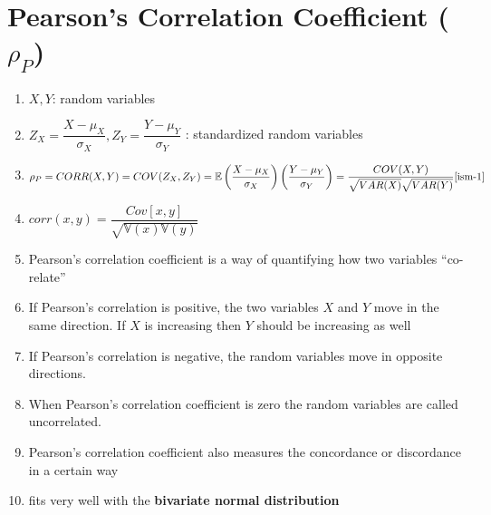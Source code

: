 \section{Pearson’s Correlation Coefficient ($\rho_P$) \cite{ism-1,mfml-1}} \label{Multivariate Distributions: Pearson’s Correlation Coefficient}

\begin{enumerate}
    \item[] $X,Y$: random variables
    
    \vspace{0.1cm}
    \item[] $
        Z_X = \dfrac{X - \mu_X}{\sigma_X},
        Z_Y = \dfrac{Y - \mu_Y}{\sigma_Y}
    $ : standardized random variables

    \vspace{0.2cm}
    
    \item[] 
    \[
        \rho_P 
        = CORR(X,Y)
        = COV(Z_X, Z_Y)
        = \mathbb{E}\dParenBrac{ \dfrac{X - \mu_X}{\sigma_X}} \dParenBrac{ \dfrac{Y - \mu_Y}{\sigma_Y} }
        = \dfrac{COV(X,Y)}{\sqrt{VAR(X)} \sqrt{VAR(Y)}}
        \hfill \text{\cite{ism-1}}
    \]
    
    \item[] $
        corr(x,y)
        = \dfrac{Cov[x,y]}{\sqrt{\mathbb{V}(x) \mathbb{V}(y)}}
    $ \hfill \cite{mfml-1}
    
    \vspace{0.2cm}
    
    \item Pearson’s correlation coefficient is a way of quantifying how two variables “co-relate”

    \item If Pearson’s correlation is positive, the two variables $X$ and $Y$ move in the same direction. If $X$ is increasing then $Y$ should be increasing as well

    \item If Pearson’s correlation is negative, the random variables move in opposite directions.

    \item When Pearson’s correlation coefficient is zero the random variables are called uncorrelated.

    \item Pearson’s correlation coefficient also measures the concordance or discordance in a certain way

    \item fits very well with the \textbf{bivariate normal distribution}


\end{enumerate}
